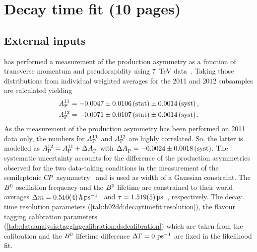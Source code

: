 
\section{Decay time fit (10 pages)}
\label{sec:b02dd:decaytimefit}



\FloatBarrier


\FloatBarrier
\subsection{External inputs}
\label{sec:b02dd:decaytimefit:constraints}

\lhcb has performed a measurement of the production asymmetry as a function
of transverse momentum and pseudorapidity using \SI{7}{\TeV}
data~\cite{LHCb-PAPER-2014-042}. Taking those distributions from \BdToDD
individual weighted averages for the 2011 and 2012 subsamples are calculated
yielding
%
\begin{equation}
  \begin{split}
    A_\text{P}^{11} &= -0.0047 \pm 0.0106 \,\text{(stat)} \pm 0.0014 \, \text{(syst)} \,, \\
    A_\text{P}^{12} &= -0.0071 \pm 0.0107 \,\text{(stat)} \pm 0.0014 \, \text{(syst)} \,.
  \end{split}
\end{equation}
%
As the measurement of the production asymmetry has been performed on 2011 data
only, the numbers for $A_\text{P}^{11}$ and $A_\text{P}^{12}$ are highly
correlated. So, the latter is modelled as $A_\text{P}^{12} = A_\text{P}^{11} +
\Delta A_\text{P}^{}$ with $\Delta A_\text{P}^{} = -0.0024 \pm 0.0018
\,\text{(syst)}$. The systematic uncertainty accounts for the difference of
the production asymmetries observed for the two data-taking conditions in the
measurement of the semileptonic ${C\!P}$ asymmetry~\cite{LHCb-PAPER-2014-053} and
is used as width of a Gaussian constraint. The ${{B}^0}$ oscillation frequency and
the ${{B}^0}$ lifetime are constrained to their world averages $\dm =
\SI{0.510\pm0.004}{\planckbar\invps}$~\cite{HFAG} and $\tau =
\SI{1.519\pm0.005}{\ps}$~\cite{PDG2014}, respectively. The decay time
resolution parameters (\cref{tab:b02dd:decaytimefit:resolution}), the flavour
tagging calibration parameters
(\cref{tab:dataanalysis:taggingcalibration:dsdcalibration}) which are taken
from the \BdToDsD calibration and the ${{B}^0}$ lifetime difference ${\Delta\Gamma} =
\SI{0}{\ensuremath{{\mathrm{ \,ps^{-1}}}}}$ are fixed in the likelihood fit.

